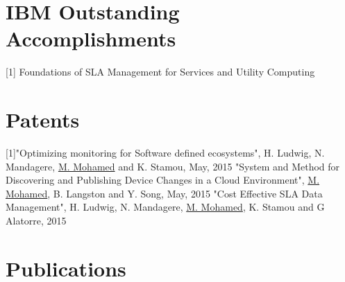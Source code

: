 \documentclass[11pt,a4paper,sans]{moderncv}   %
\begin{document}
\section{IBM Outstanding Accomplishments}
[1] Foundations of SLA Management for Services and Utility Computing
\section{Patents}
[1]"Optimizing monitoring for Software defined ecosystems", H. Ludwig, N. Mandagere, \underline{M. Mohamed} and K. Stamou, May, 2015 \newline
[2] "System and Method for Discovering and Publishing Device Changes in a Cloud Environment", \underline{M. Mohamed}, B. Langston and Y. Song, May, 2015
\newline
[3] "Cost Effective SLA Data Management", H. Ludwig, N. Mandagere, \underline{M. Mohamed}, K. Stamou and G Alatorre, 2015
\section{Publications}
\end{document}
